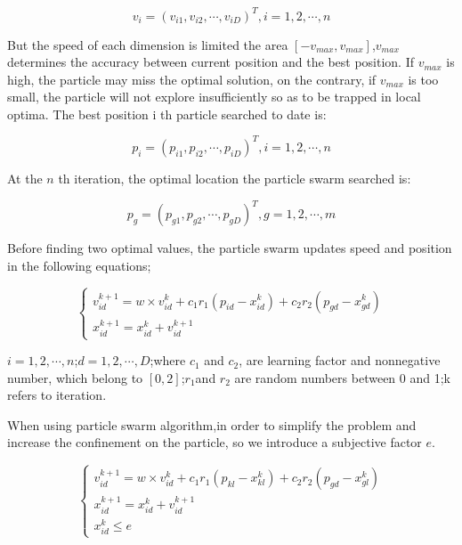 \documentclass{mcmthesis}
\begin{document}
\begin{equation}
v_i=(v_{i1},v_{i2},\cdots,v_{iD})^T,i=1,2,\cdots,n
\end{equation}

But the speed of each dimension is limited the area $[-v_{max},v_{max}]$,$v_{max}$ determines the accuracy between current position and the best position. If $v_{max}$ is high, the particle may miss the optimal solution, on the contrary, if $v_{max}$ is too small, the particle will not explore insufficiently so as to be trapped in local optima.
The best position i th particle searched to date is:

\begin{equation}
p_i=(p_{i1},p_{i2},\cdots,p_{iD})^T,i=1,2,\cdots,n
\end{equation}

At the $n$ th iteration, the optimal location the particle swarm searched is:

\begin{equation}
p_g=(p_{g1},p_{g2},\cdots,p_{gD})^T,g=1,2,\cdots,m
\end{equation}

Before finding two optimal values, the particle swarm updates speed and position in the following equations;

\begin{equation}
\begin{cases}
v_{id}^{k+1}=w \times v_{id}^k+c_1r_1(p_{id}-x_{id}^k)+c_2r_2(p_{gd}-x_{gd}^k)\\
x_{id}^{k+1}=x_{id}^k+v_{id}^{k+1}
\end{cases}
\end{equation}

$i=1,2,\cdots,n$;$d=1,2,\cdots,D$;where $c_1$ and $c_2$, are learning factor and nonnegative number, which belong to $[0,2]$;$r_1$and $r_2$ are random numbers between 0 and 1;k refers to iteration.\par
When using particle swarm algorithm,in order to simplify the problem and increase the confinement on the particle, so we introduce a subjective factor $e$.


\begin{equation}
\begin{cases}
v_{id}^{k+1}=w\times v_{id}^k+c_1r_1(p_{kl}-x_{kl}^k)+c_2r_2(p_{gd}-x_{gl}^k)\\
x_{id}^{k+1}=x_{id}^k+v_{id}^{k+1}\\
x_{id}^{k}\leqslant e
\end{cases}
\end{equation}
\end{document}
